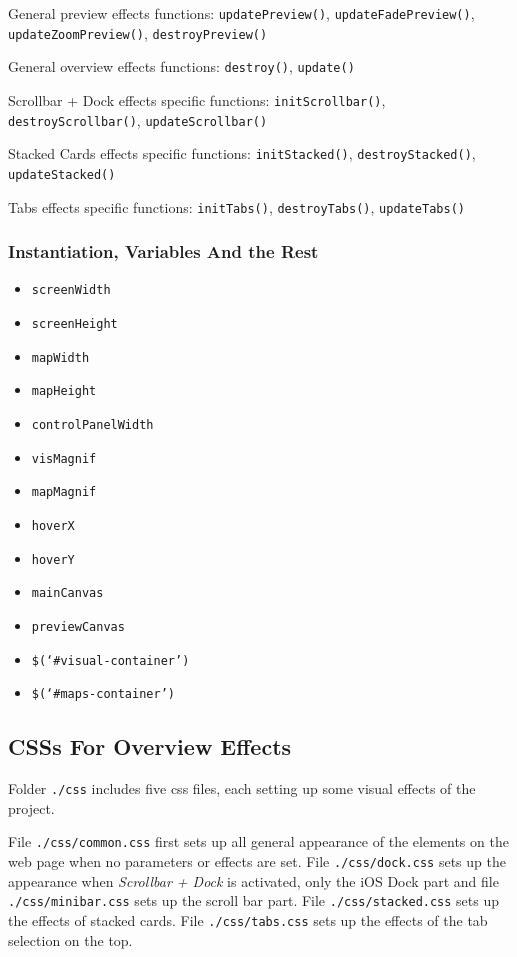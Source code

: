 General preview effects functions: \texttt{updatePreview()}, \texttt{updateFadePreview()}, \texttt{updateZoomPreview()}, \texttt{destroyPreview()}

General overview effects functions: \texttt{destroy()}, \texttt{update()}

Scrollbar + Dock effects specific functions: \texttt{initScrollbar()}, \texttt{destroyScrollbar()}, \texttt{updateScrollbar()}

Stacked Cards effects specific functions: \texttt{initStacked()}, \texttt{destroyStacked()}, \texttt{updateStacked()}

Tabs effects specific functions: \texttt{initTabs()}, \texttt{destroyTabs()}, \texttt{updateTabs()}

\subsubsection{Instantiation, Variables And the Rest}

\begin{itemize}
  \item \texttt{screenWidth}
  \item \texttt{screenHeight}
  \item \texttt{mapWidth}
  \item \texttt{mapHeight}
  \item \texttt{controlPanelWidth}
  \item \texttt{visMagnif}
  \item \texttt{mapMagnif}
  \item \texttt{hoverX}
  \item \texttt{hoverY}
  \item \texttt{mainCanvas}
  \item \texttt{previewCanvas}
  \item \texttt{\$(`\#visual-container')}
  \item \texttt{\$(`\#maps-container')}
\end{itemize}

\subsection{CSSs For Overview Effects}
\label{chap4:frontend-css}

Folder \texttt{./css} includes five \gls{css} files, each setting up some visual effects of the project.

File \texttt{./css/common.css} first sets up all general appearance of the elements on the web page when no parameters or effects are set. File \texttt{./css/dock.css} sets up the appearance when \emph{Scrollbar + Dock} is activated, only the iOS Dock part and file \\\texttt{./css/minibar.css} sets up the scroll bar part. File \texttt{./css/stacked.css} sets up the effects of stacked cards. File \texttt{./css/tabs.css} sets up the effects of the tab selection on the top.

